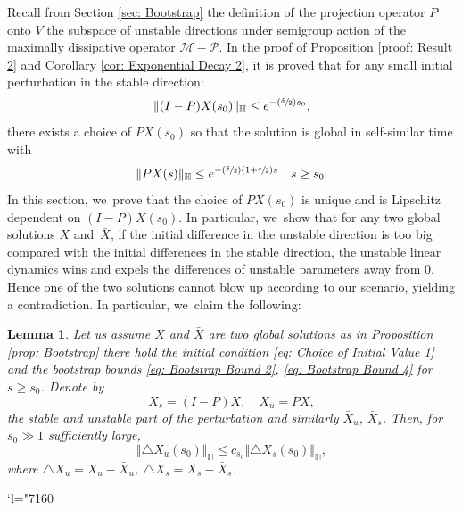 \documentclass[10pt]{amsart}
\newcommand{\Changel}{\mathcode`l="7160}
\newcommand{\Psfrac}[2]{(\sfrac{#1}{#2})}
\theoremstyle{plain}
\newtheorem{lemma}[proposition]{Lemma}
\theoremstyle{definition}
\begin{document}
Recall from Section \ref{sec: Bootstrap} the definition of the projection operator $P$ onto $V$ the subspace of unstable directions under semigroup action of the maximally dissipative operator $\mathcal M-\mathcal P$. In the proof of Proposition \ref{proof: Result 2} and Corollary \ref{cor: Exponential Decay 2}, it is proved that for any small initial perturbation in the stable direction:
\[
\Vert (I-P)X(s_0)\Vert_{\mathbb H}\le e^{-\Psfrac{\delta}{2}s_0},
\]
there exists a choice of $PX(s_0)$ so that the solution is global in self-similar time with
\[
\Vert PX(s)\Vert_{\mathbb H}\le e^{-\Psfrac{\delta}{2}(1+\sfrac{c}{2})s}\quad s\ge s_0.
\]
In this section, we~prove that the choice of $PX(s_0)$ is unique and is Lipschitz dependent on $(I-P)X(s_0)$. In particular, we~show that for any two global solutions $X$ and~$\bar X$, if the initial difference in the unstable direction is too big compared with the initial differences in the stable direction, the unstable linear dynamics wins and expels the differences of unstable parameters away from $0$. Hence one of the two solutions cannot blow up according to our scenario, yielding a contradiction. In particular, we~claim the following:

\begin{lemma}
\label{lem: Lipschitz}
Let us assume $X$ and $\bar X$ are two global solutions as in Proposition \ref{prop: Bootstrap} \ie there hold the initial condition \eqref{eq: Choice of Initial Value 1} and the bootstrap bounds \eqref{eq: Bootstrap Bound 2}, \eqref{eq: Bootstrap Bound 4} for $s\ge s_0$. Denote by
\[
X_s=(I-P)X,\quad X_u=PX,
\]
the stable and unstable part of the perturbation and similarly $\bar X_u$, $\bar X_s$. Then, for $s_0\gg1$ sufficiently large,
\begin{equation}
\label{eq: Lipschitz}
\Vert \triangle X_u(s_0)\Vert_{\mathbb H}\le c_{s_0} \Vert \triangle X_s(s_0)\Vert_{\mathbb H},
\end{equation}
where $\triangle X_u=X_u-\bar X_u$, $\triangle X_s=X_s-\bar X_s$.
\end{lemma}

\Changel
\end{document}
